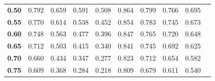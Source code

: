\begin{table}[h]
\begin{small}
\begin{tabular}{|l|l|l|l|l|l|l|l|l|l|}
\cellcolor[HTML]{EFEFEF}\textbf{0.50}   &  \cellcolor[HTML]{FFEEEE}0.792               & \cellcolor[HTML]{FFEEEE}0.659              & \cellcolor[HTML]{FFEEEE}0.591                     & \cellcolor[HTML]{FFEEEE}0.508              &  \cellcolor[HTML]{EEFFEE}0.864               & \cellcolor[HTML]{EEFFEE}0.799              & \cellcolor[HTML]{EEFFEE}0.766                    & \cellcolor[HTML]{EEFFEE}0.695              \\ \cline{1-9}
\cellcolor[HTML]{EFEFEF}\textbf{0.55}   &  \cellcolor[HTML]{FFEEEE}0.770               & \cellcolor[HTML]{FFEEEE}0.614              & \cellcolor[HTML]{FFEEEE}0.538                     & \cellcolor[HTML]{FFEEEE}0.452              &  \cellcolor[HTML]{EEFFEE}0.854               & \cellcolor[HTML]{EEFFEE}0.783              & \cellcolor[HTML]{EEFFEE}0.745                    & \cellcolor[HTML]{EEFFEE}0.673              \\ \cline{1-9} 
\cellcolor[HTML]{EFEFEF}\textbf{0.60}   &  \cellcolor[HTML]{FFEEEE}0.748               & \cellcolor[HTML]{FFEEEE}0.563              & \cellcolor[HTML]{FFEEEE}0.477                     & \cellcolor[HTML]{FFEEEE}0.396              &  \cellcolor[HTML]{EEFFEE}0.847               & \cellcolor[HTML]{EEFFEE}0.765              & \cellcolor[HTML]{EEFFEE}0.720                    & \cellcolor[HTML]{EEFFEE}0.648              \\ \cline{1-9}
\cellcolor[HTML]{EFEFEF}\textbf{0.65}   &  \cellcolor[HTML]{FFEEEE}0.712               & \cellcolor[HTML]{FFEEEE}0.503              & \cellcolor[HTML]{FFEEEE}0.415                     & \cellcolor[HTML]{FFEEEE}0.340              &  \cellcolor[HTML]{EEFFEE}0.841               & \cellcolor[HTML]{EEFFEE}0.745              & \cellcolor[HTML]{EEFFEE}0.692                    & \cellcolor[HTML]{EEFFEE}0.625              \\ \cline{1-9}
\cellcolor[HTML]{EFEFEF}\textbf{0.70}   &  \cellcolor[HTML]{FFEEEE}0.660               & \cellcolor[HTML]{FFEEEE}0.434              & \cellcolor[HTML]{FFEEEE}0.347                     & \cellcolor[HTML]{FFEEEE}0.277              &  \cellcolor[HTML]{EEFFEE}0.823               & \cellcolor[HTML]{EEFFEE}0.712              & \cellcolor[HTML]{EEFFEE}0.654                    & \cellcolor[HTML]{EEFFEE}0.582              \\ \cline{1-9}
\cellcolor[HTML]{EFEFEF}\textbf{0.75}   &  \cellcolor[HTML]{FFEEEE}0.609               & \cellcolor[HTML]{FFEEEE}0.368              & \cellcolor[HTML]{FFEEEE}0.284                     & \cellcolor[HTML]{FFEEEE}0.218              &  \cellcolor[HTML]{EEFFEE}0.809               & \cellcolor[HTML]{EEFFEE}0.679              & \cellcolor[HTML]{EEFFEE}0.611                    & \cellcolor[HTML]{EEFFEE}0.540              \\ \cline{1-9} 

\end{tabular}
\end{small}
\end{table}
